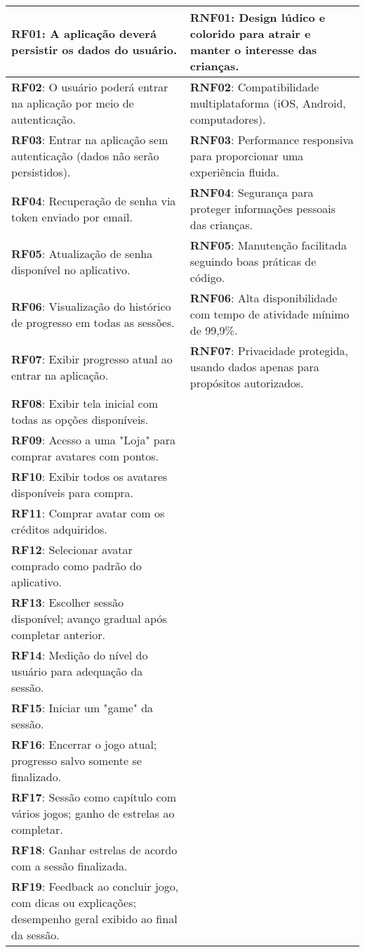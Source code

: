 \begin{longtable}{|p{6cm}|p{6cm}|}
    \small
    \textbf{RF01}: A aplicação deverá persistir os dados do usuário. & \textbf{RNF01}: Design lúdico e colorido para atrair e manter o interesse das crianças. \\
    \hline
    \textbf{RF02}: O usuário poderá entrar na aplicação por meio de autenticação. & \textbf{RNF02}: Compatibilidade multiplataforma (iOS, Android, computadores). \\
    \hline
    \textbf{RF03}: Entrar na aplicação sem autenticação (dados não serão persistidos). & \textbf{RNF03}: Performance responsiva para proporcionar uma experiência fluida. \\
    \hline
    \textbf{RF04}: Recuperação de senha via token enviado por email. & \textbf{RNF04}: Segurança para proteger informações pessoais das crianças. \\
    \hline
    \textbf{RF05}: Atualização de senha disponível no aplicativo. & \textbf{RNF05}: Manutenção facilitada seguindo boas práticas de código. \\
    \hline
    \textbf{RF06}: Visualização do histórico de progresso em todas as sessões. & \textbf{RNF06}: Alta disponibilidade com tempo de atividade mínimo de 99,9\%. \\
    \hline
    \textbf{RF07}: Exibir progresso atual ao entrar na aplicação. & \textbf{RNF07}: Privacidade protegida, usando dados apenas para propósitos autorizados. \\
    \hline
    \textbf{RF08}: Exibir tela inicial com todas as opções disponíveis. & \\
    \hline
    \textbf{RF09}: Acesso a uma "Loja" para comprar avatares com pontos. & \\
    \hline
    \textbf{RF10}: Exibir todos os avatares disponíveis para compra. & \\
    \hline
    \textbf{RF11}: Comprar avatar com os créditos adquiridos. & \\
    \hline
    \textbf{RF12}: Selecionar avatar comprado como padrão do aplicativo. & \\
    \hline
    \textbf{RF13}: Escolher sessão disponível; avanço gradual após completar anterior. & \\
    \hline
    \textbf{RF14}: Medição do nível do usuário para adequação da sessão. & \\
    \hline
    \textbf{RF15}: Iniciar um "game" da sessão. & \\
    \hline
    \textbf{RF16}: Encerrar o jogo atual; progresso salvo somente se finalizado. & \\
    \hline
    \textbf{RF17}: Sessão como capítulo com vários jogos; ganho de estrelas ao completar. & \\
    \hline
    \textbf{RF18}: Ganhar estrelas de acordo com a sessão finalizada. & \\
    \hline
    \textbf{RF19}: Feedback ao concluir jogo, com dicas ou explicações; desempenho geral exibido ao final da sessão. & \\
    \hline
\end{longtable}
